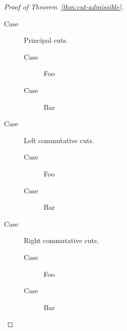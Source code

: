 \begin{proof}[Proof of Theorem~\ref{thm:cut-admissible}]
\begin{description}
\item[Case]
  Principal cuts.
  \begin{description}
  \item[Case] Foo
  \item[Case] Bar
  \end{description}

\item[Case]
  Left commutative cuts.
  \begin{description}
  \item[Case] Foo
  \item[Case] Bar
  \end{description}

\item[Case]
  Right commutative cuts.
  \begin{description}
  \item[Case] Foo
  \item[Case] Bar
  \end{description}

\end{description}

\end{proof}
